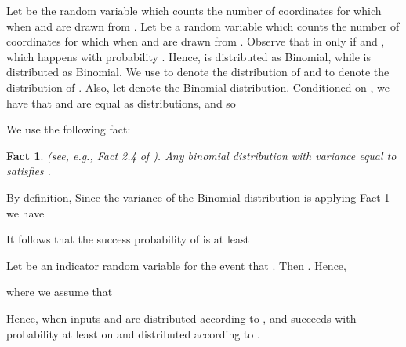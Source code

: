 \documentclass[twoside,leqno,twocolumn]{article}
\newtheorem{fact}[theorem]{Fact}
\begin{document}
Let  be the random variable which counts the number of 
coordinates  for which  when  and  are 
drawn from . Let  be a random
variable which counts the number of coordinates  for which
 when  and  are drawn from . 
Observe that  in  only if  and , which happens
with probability . Hence,
 is distributed as Binomial, while
 is distributed as Binomial. We use
 to denote the distribution of  and  to denote
the distribution of . Also, let  denote the 
Binomial distribution. 
Conditioned on , we have that  and  are
equal as distributions, and so 

We use the following fact:
\begin{fact}\label{fact:vd} (see, e.g., Fact 2.4 of \cite{gmrz11}). 
Any binomial distribution  with variance equal to  
satisfies . 
\end{fact}
By definition, 
Since the variance of the Binomial distribution is 
 applying
Fact \ref{fact:vd} we have

It follows that the success probability of  is at least 

Let  be an indicator random variable for the event that . Then
. Hence,

where we assume that 

Hence,  when inputs
 and  are distributed according to , and  succeeds
with probability at least  on  and  distributed
according to . 
\end{document}

